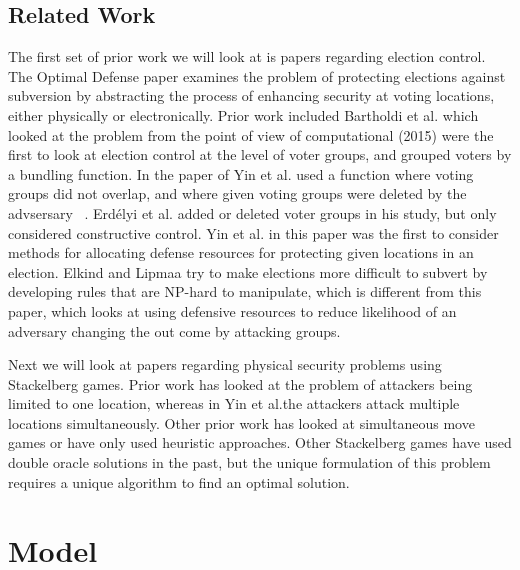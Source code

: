 \documentclass[letterpaper]{article} %
\begin{document}
\subsection{Related Work}

The first set of prior work we will look at is papers regarding election control. The Optimal Defense paper examines the problem of protecting elections against subversion by abstracting the process of enhancing security at voting locations, either physically or electronically. Prior work included Bartholdi et al. which looked at the problem from the point of view of computational (2015) were the first to look at election control at the level of voter groups, and grouped voters by a bundling function. In the paper of Yin et al. used a function where voting groups did not overlap, and where given voting groups were deleted by the advsersary ~\cite{article}. Erdélyi et al. added or deleted voter groups in his study, but only considered constructive control.  Yin et al. in this paper was the first to consider methods for allocating defense resources for protecting given locations in an election. Elkind and Lipmaa try to make elections more difficult to subvert by developing rules that are NP-hard to manipulate, which is different from this paper, which looks at using defensive resources to reduce likelihood of an adversary changing the out come by attacking groups.

Next we will look at papers regarding physical security problems using Stackelberg games. Prior work has looked at the problem of attackers being limited to one location, whereas in Yin et al.the attackers attack multiple locations simultaneously. Other prior work has looked at simultaneous move games or have only used heuristic approaches. Other Stackelberg games have used double oracle solutions in the past, but the unique formulation of this problem requires a unique algorithm to find an optimal solution.

\section{Model}
\end{document}

